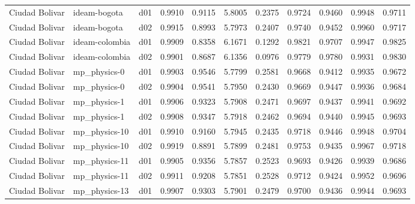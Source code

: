 \begin{longtable}{lllrrrrrrrr}
       Ciudad Bolivar  &          ideam-bogota &     d01 &   0.9910 &   0.9115 &   5.8005 &       0.2375 &        0.9724 &       0.9460 &           0.9948 &  0.9711 \\
       Ciudad Bolivar  &          ideam-bogota &     d02 &   0.9915 &   0.8993 &   5.7973 &       0.2407 &        0.9740 &       0.9452 &           0.9960 &  0.9717 \\
       Ciudad Bolivar  &        ideam-colombia &     d01 &   0.9909 &   0.8358 &   6.1671 &       0.1292 &        0.9821 &       0.9707 &           0.9947 &  0.9825 \\
       Ciudad Bolivar  &        ideam-colombia &     d02 &   0.9901 &   0.8687 &   6.1356 &       0.0976 &        0.9779 &       0.9780 &           0.9931 &  0.9830 \\
       Ciudad Bolivar  &          mp\_physics-0 &     d01 &   0.9903 &   0.9546 &   5.7799 &       0.2581 &        0.9668 &       0.9412 &           0.9935 &  0.9672 \\
       Ciudad Bolivar  &          mp\_physics-0 &     d02 &   0.9904 &   0.9541 &   5.7950 &       0.2430 &        0.9669 &       0.9447 &           0.9936 &  0.9684 \\
       Ciudad Bolivar  &          mp\_physics-1 &     d01 &   0.9906 &   0.9323 &   5.7908 &       0.2471 &        0.9697 &       0.9437 &           0.9941 &  0.9692 \\
       Ciudad Bolivar  &          mp\_physics-1 &     d02 &   0.9908 &   0.9347 &   5.7918 &       0.2462 &        0.9694 &       0.9440 &           0.9945 &  0.9693 \\
       Ciudad Bolivar  &         mp\_physics-10 &     d01 &   0.9910 &   0.9160 &   5.7945 &       0.2435 &        0.9718 &       0.9446 &           0.9948 &  0.9704 \\
       Ciudad Bolivar  &         mp\_physics-10 &     d02 &   0.9919 &   0.8891 &   5.7899 &       0.2481 &        0.9753 &       0.9435 &           0.9967 &  0.9718 \\
       Ciudad Bolivar  &         mp\_physics-11 &     d01 &   0.9905 &   0.9356 &   5.7857 &       0.2523 &        0.9693 &       0.9426 &           0.9939 &  0.9686 \\
       Ciudad Bolivar  &         mp\_physics-11 &     d02 &   0.9911 &   0.9208 &   5.7851 &       0.2528 &        0.9712 &       0.9424 &           0.9952 &  0.9696 \\
       Ciudad Bolivar  &         mp\_physics-13 &     d01 &   0.9907 &   0.9303 &   5.7901 &       0.2479 &        0.9700 &       0.9436 &           0.9944 &  0.9693 \\

\end{longtable}
